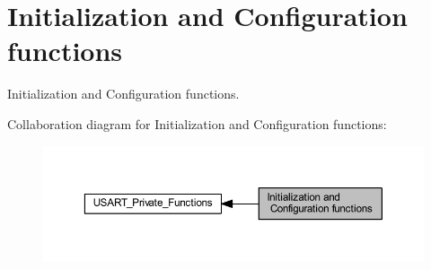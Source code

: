 \hypertarget{group___u_s_a_r_t___group1}{}\section{Initialization and Configuration functions}
\label{group___u_s_a_r_t___group1}


Initialization and Configuration functions.  


Collaboration diagram for Initialization and Configuration functions\+:\nopagebreak
\begin{figure}[H]
\begin{center}
\leavevmode
\includegraphics[width=350pt]{group___u_s_a_r_t___group1}
\end{center}
\end{figure}
